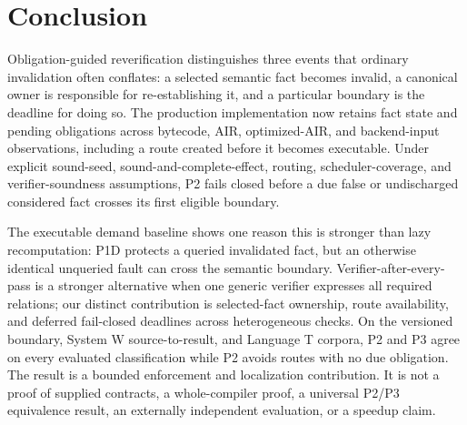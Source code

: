 \section{Conclusion}
Obligation-guided reverification distinguishes three events that ordinary invalidation often conflates: a selected semantic fact becomes invalid, a canonical owner is responsible for re-establishing it, and a particular boundary is the deadline for doing so. The production implementation now retains fact state and pending obligations across bytecode, AIR, optimized-AIR, and backend-input observations, including a route created before it becomes executable. Under explicit sound-seed, sound-and-complete-effect, routing, scheduler-coverage, and verifier-soundness assumptions, P2 fails closed before a due false or undischarged considered fact crosses its first eligible boundary.

The executable demand baseline shows one reason this is stronger than lazy recomputation: P1D protects a queried invalidated fact, but an otherwise identical unqueried fault can cross the semantic boundary. Verifier-after-every-pass is a stronger alternative when one generic verifier expresses all required relations; our distinct contribution is selected-fact ownership, route availability, and deferred fail-closed deadlines across heterogeneous checks. On the versioned boundary, System W source-to-result, and Language T corpora, P2 and P3 agree on every evaluated classification while P2 avoids routes with no due obligation. The result is a bounded enforcement and localization contribution. It is not a proof of supplied contracts, a whole-compiler proof, a universal P2/P3 equivalence result, an externally independent evaluation, or a speedup claim.
